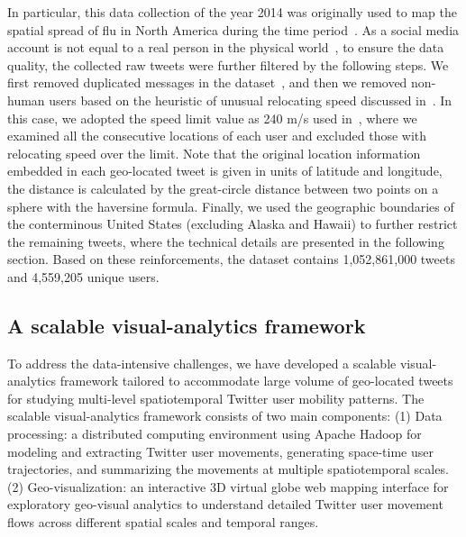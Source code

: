 \documentclass[ijgi,article,accept,moreauthors,pdftex,10pt,a4paper]{mdpi}
\theoremstyle{mdpi}
\newcounter{ex}
\newcounter{re}
\theoremstyle{mdpidefinition}
\begin{document}
In particular, this data collection of the year 2014 was originally used to map the spatial spread of flu in North America during the time period~\cite{padmanabhan2014flumapper}.
As a social media account is not equal to a real person in the physical world~\cite{tsou2015}, to ensure the data quality, the collected raw tweets were further filtered by the following steps.
We first removed duplicated messages in the dataset~\cite{black2012twitter}, and then we removed non-human users based on the heuristic of unusual relocating speed discussed in~\cite{hawelka2014geo,Jurdak2015}.
In this case, we adopted the speed limit value as 240 m/s used in~\cite{Jurdak2015}, where we examined all the consecutive locations of each user and excluded those with relocating speed over the limit.
Note that the original location information embedded in each geo-located tweet is given in units of latitude and longitude, the distance is calculated by the great-circle distance between two points on a sphere with the haversine formula.
Finally, we used the geographic boundaries of the conterminous United States (excluding Alaska and Hawaii) to further restrict the remaining tweets, where the technical details are presented in the following section. Based on these reinforcements, the dataset contains 1,052,861,000 tweets and 4,559,205 unique users.

\subsection{A scalable visual-analytics framework}
To address the data-intensive challenges, we have developed a scalable visual-analytics framework tailored to accommodate large volume of geo-located tweets for studying multi-level spatiotemporal Twitter user mobility patterns.
The scalable visual-analytics framework consists of two main components: (1) Data processing: a distributed computing environment using Apache Hadoop for modeling and extracting Twitter user movements, generating space-time user trajectories, and summarizing the movements at multiple spatiotemporal scales.
(2) Geo-visualization: an interactive 3D virtual globe web mapping interface for exploratory geo-visual analytics to understand detailed Twitter user movement flows across different spatial scales and temporal ranges. 
\end{document}
